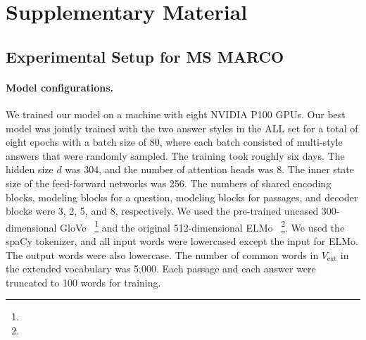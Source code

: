 \documentclass[11pt,a4paper]{article}
\theoremstyle{mydef}
\theoremstyle{myprob}
\begin{document}





\appendix

\section{Supplementary Material}

\subsection{Experimental Setup for MS MARCO}
\label{sec:setup1}

\paragraph{Model configurations.}
We trained our model on a machine with eight NVIDIA P100 GPUs. Our best model was jointly trained with the two answer styles in the ALL set for a total of eight epochs with a batch size of 80, where each batch consisted of multi-style answers that were randomly sampled.
The training took roughly six days.  
The hidden size $d$ was 304, and the number of attention heads was 8. The inner state size of the feed-forward networks was 256. The numbers of shared encoding blocks, modeling blocks for a question, modeling blocks for passages, and decoder blocks were 3, 2, 5, and 8, respectively. We used the pre-trained uncased 300-dimensional 
GloVe~\citep{PenningtonSM14}%
\footnote{}
and the original 512-dimensional 
ELMo~\citep{PetersNIGCLZ18}%
\footnote{}. 
We used the spaCy tokenizer, and all input words were lowercased except the input for ELMo. The output words were also lowercase.
The number of common words 
in $V_\mathrm{ext}$ in the extended vocabulary 
was 5,000. Each passage and each answer were truncated to 100 words for training.
\end{document}
